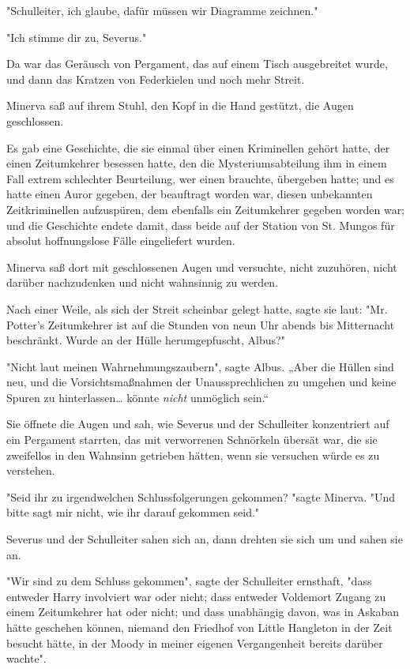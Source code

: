 {"Schulleiter, ich glaube, dafür müssen wir Diagramme zeichnen."

"Ich stimme dir zu, Severus."

Da war das Geräusch von Pergament, das auf einem Tisch ausgebreitet wurde, und dann das Kratzen von Federkielen und noch mehr Streit.

Minerva saß auf ihrem Stuhl, den Kopf in die Hand gestützt, die Augen geschlossen.

Es gab eine Geschichte, die sie einmal über einen Kriminellen gehört hatte, der einen Zeitumkehrer besessen hatte, den die Mysteriumsabteilung ihm in einem Fall extrem schlechter Beurteilung, wer einen brauchte, übergeben hatte; und es hatte einen Auror gegeben, der beauftragt worden war, diesen unbekannten Zeitkriminellen aufzuspüren, dem ebenfalls ein Zeitumkehrer gegeben worden war; und die Geschichte endete damit, dass beide auf der Station von St. Mungos für absolut hoffnungslose Fälle eingeliefert wurden.

Minerva saß dort mit geschlossenen Augen und versuchte, nicht zuzuhören, nicht darüber nachzudenken und nicht wahnsinnig zu werden.

Nach einer Weile, als sich der Streit scheinbar gelegt hatte, sagte sie laut: "Mr. Potter's Zeitumkehrer ist auf die Stunden von neun Uhr abends bis Mitternacht beschränkt. Wurde an der Hülle herumgepfuscht, Albus?"

"Nicht laut meinen Wahrnehmungszaubern", sagte Albus. „Aber die Hüllen sind neu, und die Vorsichtsmaßnahmen der Unaussprechlichen zu umgehen und keine Spuren zu hinterlassen… könnte \emph{nicht} unmöglich sein.“

Sie öffnete die Augen und sah, wie Severus und der Schulleiter konzentriert auf ein Pergament starrten, das mit verworrenen Schnörkeln übersät war, die sie zweifellos in den Wahnsinn getrieben hätten, wenn sie versuchen würde es zu verstehen.

"Seid ihr zu irgendwelchen Schlussfolgerungen gekommen? "sagte Minerva. "Und bitte sagt mir nicht, wie ihr darauf gekommen seid."

Severus und der Schulleiter sahen sich an, dann drehten sie sich um und sahen sie an.

"Wir sind zu dem Schluss gekommen", sagte der Schulleiter ernsthaft, "dass entweder Harry involviert war oder nicht; dass entweder Voldemort Zugang zu einem Zeitumkehrer hat oder nicht; und dass unabhängig davon, was in Askaban hätte geschehen können, niemand den Friedhof von Little Hangleton in der Zeit besucht hätte, in der Moody in meiner eigenen Vergangenheit bereits darüber wachte".

}
